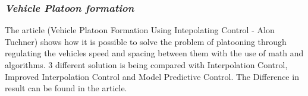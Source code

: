 \subsubsection{\textit{Vehicle Platoon formation}}
% 
The article (Vehicle Platoon Formation Using Intepolating Control - Alon Tuchner) shows how it is possible to solve the problem of platooning through regulating the vehicles speed and spacing between them with the use of math and algorithms. 3 different solution is being compared with Interpolation Control, Improved Interpolation Control and Model Predictive Control. The Difference in result can be found in the article.\par
% 